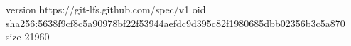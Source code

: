 version https://git-lfs.github.com/spec/v1
oid sha256:5638f9cf8c5a90978bf22f53944aefdc9d395c82f1980685dbb02356b3c5a870
size 21960
